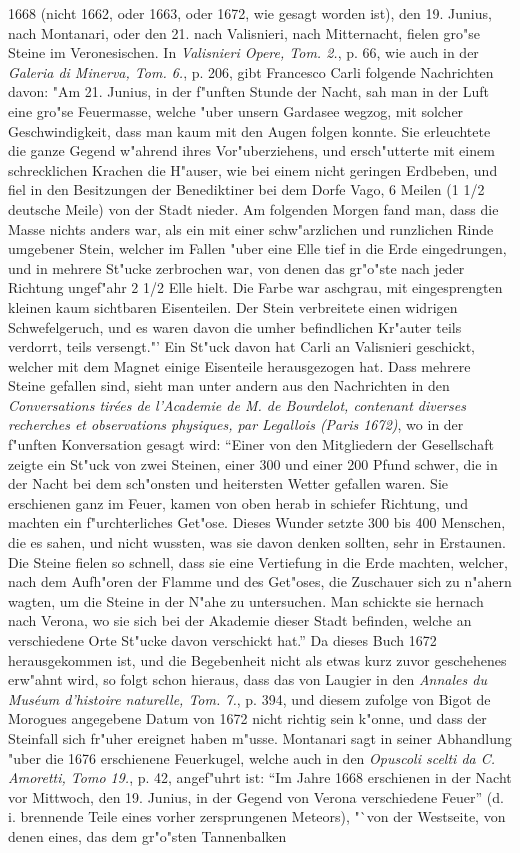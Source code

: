 \documentclass[a4paper, 11pt, oneside, polutonikogreek, german]{article}
\begin{document}
1668 (nicht 1662, oder 1663, oder 1672, wie gesagt worden ist), den 19. Junius, nach Montanari, oder den 21. nach Valisnieri, nach Mitternacht, fielen gro"se Steine im Veronesischen. In \emph{Valisnieri Opere, Tom. 2.}, p. 66, wie auch in der \emph{Galeria di Minerva, Tom. 6.}, p. 206, gibt Francesco Carli folgende Nachrichten davon: "Am 21. Junius, in der f"unften Stunde der Nacht, sah man in der Luft eine gro"se Feuermasse, welche "uber unsern Gardasee wegzog, mit solcher Geschwindigkeit, dass man kaum mit den Augen folgen konnte. Sie erleuchtete die ganze Gegend w"ahrend ihres Vor"uberziehens, und ersch"utterte mit einem schrecklichen Krachen die H"auser, wie bei einem nicht geringen Erdbeben, und fiel in den Besitzungen der Benediktiner bei dem Dorfe Vago, 6 Meilen (1 1/2 deutsche Meile) von der Stadt nieder. Am folgenden Morgen fand man, dass die Masse nichts anders war, als ein mit einer schw"arzlichen und runzlichen Rinde umgebener Stein, welcher im Fallen "uber eine Elle tief in die Erde eingedrungen, und in mehrere St"ucke zerbrochen war, von denen das gr"o"ste nach jeder Richtung ungef"ahr 2 1/2 Elle hielt. Die Farbe war aschgrau, mit eingesprengten kleinen kaum sichtbaren Eisenteilen. Der Stein verbreitete einen widrigen Schwefelgeruch, und es waren davon die umher befindlichen Kr"auter teils verdorrt, teils versengt."' Ein St"uck davon hat Carli an Valisnieri geschickt, welcher mit dem Magnet einige Eisenteile herausgezogen hat. Dass mehrere Steine gefallen sind, sieht man unter andern aus den Nachrichten in den \emph{Conversations tirées de l'Academie de M. de Bourdelot, contenant diverses recherches et observations physiques, par Legallois (Paris 1672)}, wo in der f"unften Konversation gesagt wird: "`Einer von den Mitgliedern der Gesellschaft zeigte ein St"uck von zwei Steinen, einer 300 und einer 200 Pfund schwer, die in der Nacht bei dem sch"onsten und heitersten Wetter gefallen waren. Sie erschienen ganz im Feuer, kamen von oben herab in schiefer Richtung, und machten ein f"urchterliches Get"ose. Dieses Wunder setzte 300 bis 400 Menschen, die es sahen, und nicht wussten, was sie davon denken sollten, sehr in Erstaunen. Die Steine fielen so schnell, dass sie eine Vertiefung in die Erde machten, welcher, nach dem Aufh"oren der Flamme und des Get"oses, die Zuschauer sich zu n"ahern wagten, um die Steine in der N"ahe zu untersuchen. Man schickte sie hernach nach Verona, wo sie sich bei der Akademie dieser Stadt befinden, welche an verschiedene Orte St"ucke davon verschickt hat."' Da dieses Buch 1672 herausgekommen ist, und die Begebenheit nicht als etwas kurz zuvor geschehenes erw"ahnt wird, so folgt schon hieraus, dass das von Laugier in den \emph{Annales du Muséum d'histoire naturelle, Tom. 7.}, p. 394, und diesem zufolge von Bigot de Morogues angegebene Datum von 1672 nicht richtig sein k"onne, und dass der Steinfall sich fr"uher ereignet haben m"usse. Montanari sagt in seiner Abhandlung "uber die 1676 erschienene Feuerkugel, welche auch in den \emph{Opuscoli scelti da C. Amoretti, Tomo 19.}, p. 42, angef"uhrt ist: "`Im Jahre 1668 erschienen in der Nacht vor Mittwoch, den 19. Junius, in der Gegend von Verona verschiedene Feuer"' (d. i. brennende Teile eines vorher zersprungenen Meteors), "`von der Westseite, von denen eines, das dem gr"o"sten Tannenbalken 
\end{document}

